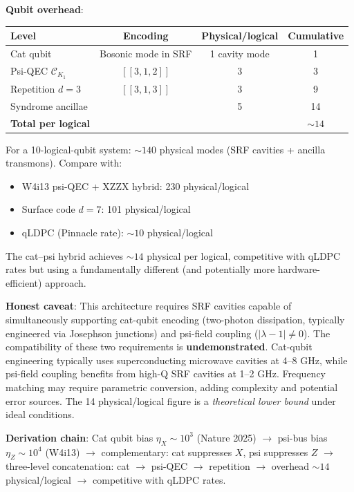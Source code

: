 \documentclass[11pt]{article}
\theoremstyle{definition}
\theoremstyle{remark}
\newcommand{\CK}{\mathcal{C}_K}
\newcommand{\lamdiff}{|\lambda-1|}
\begin{document}
\begin{tcolorbox}[colback=blue!5!white, colframe=blue!60!black,
  title=\textbf{W4i14 TOP 5 FINDINGS --- READ FIRST}]
\begin{enumerate}[nosep]
  \textbf{Qubit overhead}:
  \begin{center}
  \begin{tabular}{@{}lccc@{}}
  \toprule
  Level & Encoding & Physical/logical & Cumulative \\
  \midrule
  Cat qubit & Bosonic mode in SRF & 1 cavity mode & 1 \\
  Psi-QEC $\CK_1$ & $[[3,1,2]]$ & 3 & 3 \\
  Repetition $d=3$ & $[[3,1,3]]$ & 3 & 9 \\
  Syndrome ancillae & & 5 & 14 \\
  \midrule
  \textbf{Total per logical} & & & \textbf{$\sim 14$} \\
  \bottomrule
  \end{tabular}
  \end{center}

  For a 10-logical-qubit system: $\sim 140$ physical modes (SRF cavities
  + ancilla transmons).  Compare with:
  \begin{itemize}[nosep]
    \item W4i13 psi-QEC + XZZX hybrid: 230 physical/logical
    \item Surface code $d = 7$: 101 physical/logical
    \item qLDPC (Pinnacle rate): $\sim 10$ physical/logical
  \end{itemize}

  The cat--psi hybrid achieves $\sim 14$ physical per logical, competitive
  with qLDPC rates but using a fundamentally different (and potentially
  more hardware-efficient) approach.

  \textbf{Honest caveat}: This architecture requires SRF cavities capable
  of simultaneously supporting cat-qubit encoding (two-photon dissipation,
  typically engineered via Josephson junctions) and psi-field coupling
  ($\lamdiff \neq 0$).  The compatibility of these two requirements is
  \textbf{undemonstrated}.  Cat-qubit engineering typically uses
  superconducting microwave cavities at 4--8 GHz, while psi-field coupling
  benefits from high-Q SRF cavities at 1--2 GHz.  Frequency matching
  may require parametric conversion, adding complexity and potential
  error sources.  The 14 physical/logical figure is a \emph{theoretical
  lower bound} under ideal conditions.

  \textbf{Derivation chain}: Cat qubit bias $\eta_X \sim 10^3$ (Nature 2025)
  $\to$ psi-bus bias $\eta_Z \sim 10^4$ (W4i13)
  $\to$ complementary: cat suppresses $X$, psi suppresses $Z$
  $\to$ three-level concatenation: cat $\to$ psi-QEC $\to$ repetition
  $\to$ overhead $\sim 14$ physical/logical
  $\to$ competitive with qLDPC rates.


\end{enumerate}
\end{tcolorbox}
\end{document}
